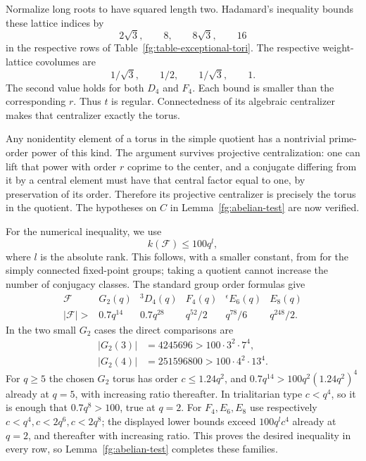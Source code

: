Normalize long roots to have squared length two. Hadamard's
inequality bounds these lattice indices by
\begin{equation}\label{fg:root-index}
 2\sqrt3,\qquad 8,\qquad 8\sqrt3,\qquad16
\end{equation}
in the respective rows of Table~\ref{fg:table-exceptional-tori}.
The respective weight-lattice covolumes are
\[
 1/\sqrt3,\qquad1/2,\qquad1/\sqrt3,\qquad1.
\]
The second value holds for both $D_4$ and $F_4$.
Each bound is smaller than the corresponding $r$.
Thus $t$ is regular. Connectedness of its algebraic centralizer
makes that centralizer exactly the torus.

Any nonidentity element of a torus in the simple quotient has a
nontrivial prime-order power of this kind. The argument survives
projective centralization: one can lift that power with order $r$
coprime to the center, and a conjugate differing from it by a
central element must have that central factor equal to one,
by preservation of its order. Therefore its projective centralizer
is precisely the torus in the quotient. The hypotheses on $C$
in Lemma~\ref{fg:abelian-test} are now verified.

For the numerical inequality, we use
\begin{equation}\label{fg:exceptional-class-bound}
 k(\mathcal F)\le100q^l,
\end{equation}
where $l$ is the absolute rank. This follows, with a smaller
constant, from \cite[Theorem~1.1, p.~3024]{FulmanGuralnick} for the simply
connected fixed-point groups; taking a quotient cannot increase
the number of conjugacy classes. The standard group order
formulas \cite[Tables~24.1--24.2, pp.~208, 211]{MalleTesterman} give
\[
 \begin{array}{c|ccccc}
 \mathcal F&G_2(q)&{}^3D_4(q)&F_4(q)&{}^{\epsilon}E_6(q)&E_8(q)\\
 \hline
 |\mathcal F|>&0.7q^{14}&0.7q^{28}&q^{52}/2&q^{78}/6&q^{248}/2.
 \end{array}
\]
In the two small $G_2$ cases the direct comparisons are
\[
 \begin{aligned}
 |G_2(3)|&=4245696>100\cdot3^2\cdot7^4,\\
 |G_2(4)|&=251596800>100\cdot4^2\cdot13^4.
 \end{aligned}
\]
For $q\ge5$ the chosen $G_2$ torus has order $c\le1.24q^2$, and
$0.7q^{14}>100q^2(1.24q^2)^4$ already at $q=5$, with increasing
ratio thereafter. In trialitarian type $c<q^4$, so it is enough
that $0.7q^8>100$, true at $q=2$. For $F_4,E_6,E_8$ use respectively
$c<q^4,c<2q^6,c<2q^8$; the displayed lower bounds exceed
$100q^l c^4$ already at $q=2$, and thereafter with increasing
ratio. This proves the desired inequality in every row, so
Lemma~\ref{fg:abelian-test} completes these families.

